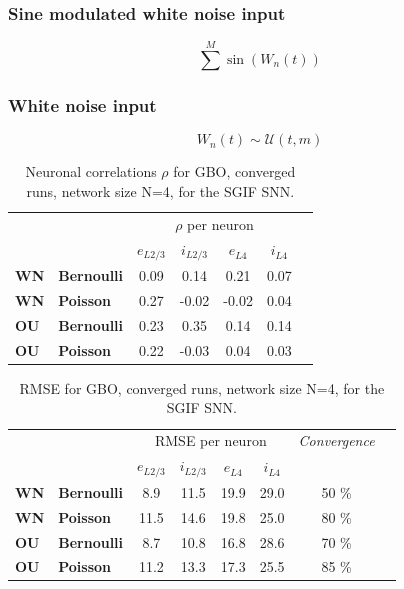 \documentclass[mphil,deptreport,ianc]{infthesis} %
\begin{document}
\subsubsection*{Sine modulated white noise input}

\begin{equation}
    \sum^M \sin(W_n(t))
\end{equation}

\subsubsection*{White noise input}

\begin{equation}
    W_n(t) \sim \mathcal{U}(t, m)
\end{equation}



\begin{table}
\caption{Neuronal correlations $\rho$ for GBO, converged runs, network size N=4, for the SGIF SNN.}
\label{tab:rho_converged_GBO_pop}
\begin{center}
\begin{tabular}{ l l c c c c c }
 & & \multicolumn{4}{c}{$\rho$ per neuron} \\
 & & $e_{L2/3}$ & $i_{L2/3}$ & $e_{L4}$ & $i_{L4}$ \\
 \textbf{WN} & \textbf{Bernoulli} & 0.09 & 0.14 & 0.21 & 0.07 \\ 
 \textbf{WN} & \textbf{Poisson} & 0.27 & -0.02 & -0.02 & 0.04 \\  
 \textbf{OU} & \textbf{Bernoulli} & 0.23 & 0.35 & 0.14 & 0.14 \\ 
 \textbf{OU} & \textbf{Poisson} & 0.22 & -0.03 & 0.04 & 0.03 \\  
\end{tabular}
\end{center}
\end{table}

\begin{table}
\caption{RMSE for GBO, converged runs, network size N=4, for the SGIF SNN.}
\label{tab:rho_converged_GBO_pop}
\begin{center}
\begin{tabular}{ l l c c c c c c }
& & \multicolumn{4}{c}{RMSE per neuron} & \textit{Convergence} \\
& & $e_{L2/3}$ & $i_{L2/3}$ & $e_{L4}$ & $i_{L4}$ \\
 \textbf{WN} & \textbf{Bernoulli} & 8.9 & 11.5 & 19.9 & 29.0 & 50 \% \\ 
 \textbf{WN} & \textbf{Poisson} & 11.5 & 14.6 & 19.8 & 25.0 & 80 \% \\  
 \textbf{OU} & \textbf{Bernoulli} & 8.7 & 10.8 & 16.8 & 28.6 & 70 \% \\ 
 \textbf{OU} & \textbf{Poisson} & 11.2 & 13.3 & 17.3 & 25.5 & 85 \% \\  
\end{tabular}
\end{center}
\end{table}
\end{document}

